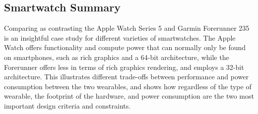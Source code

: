 \subsection{Smartwatch Summary}
Comparing as contrasting the Apple Watch Series 5 and Garmin Forerunner 235 is an insightful case study
for different varieties of smartwatches. The Apple Watch offers functionality and compute power 
that can normally only be found on smartphones, such as rich graphics and a 64-bit architecture, while
the Forerunner offers less in terms of rich graphics rendering, and employs a 32-bit architecture.
This illustrates different trade-offs between performance and power consumption between the 
two wearables, and shows how regardless of the type of wearable, the footprint of the hardware, and
power consumption are the two most important design criteria and constraints.